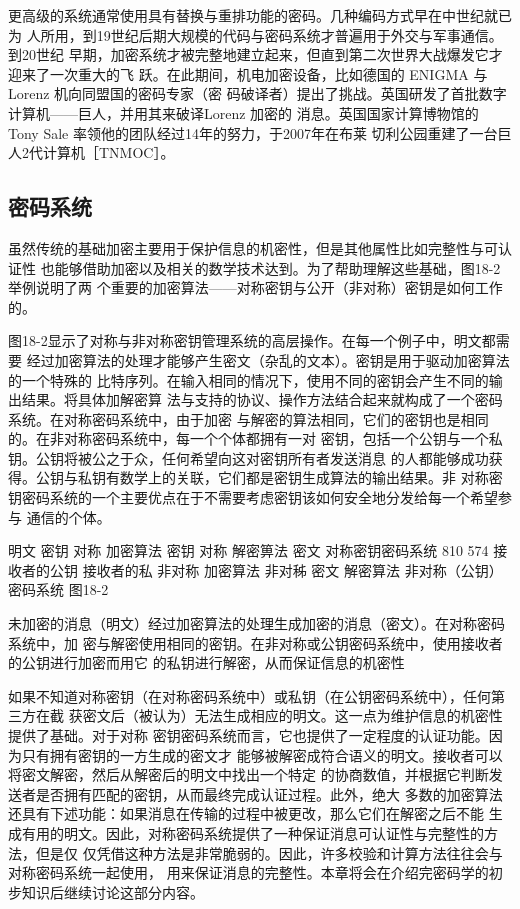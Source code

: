 更高级的系统通常使用具有替换与重排功能的密码。几种编码方式早在中世纪就已为
人所用，到19世纪后期大规模的代码与密码系统才普遍用于外交与军事通信。到20世纪
早期，加密系统才被完整地建立起来，但直到第二次世界大战爆发它才迎来了一次重大的飞
跃。在此期间，机电加密设备，比如德国的 ENIGMA 与Lorenz 机向同盟国的密码专家（密
码破译者）提出了挑战。英国研发了首批数字计算机——巨人，并用其来破译Lorenz 加密的
消息。英国国家计算博物馆的 Tony Sale 率领他的团队经过14年的努力，于2007年在布莱
切利公园重建了一台巨人2代计算机［TNMOC］。

\subsection{密码系统}
虽然传统的基础加密主要用于保护信息的机密性，但是其他属性比如完整性与可认证性
也能够借助加密以及相关的数学技术达到。为了帮助理解这些基础，图18-2举例说明了两
个重要的加密算法——对称密钥与公开（非对称）密钥是如何工作的。

图18-2显示了对称与非对称密钥管理系统的高层操作。在每一个例子中，明文都需要
经过加密算法的处理才能够产生密文（杂乱的文本）。密钥是用于驱动加密算法的一个特殊的
比特序列。在输入相同的情况下，使用不同的密钥会产生不同的输出结果。将具体加解密算
法与支持的协议、操作方法结合起来就构成了一个密码系统。在对称密码系统中，由于加密
与解密的算法相同，它们的密钥也是相同的。在非对称密码系统中，每一个个体都拥有一对
密钥，包括一个公钥与一个私钥。公钥将被公之于众，任何希望向这对密钥所有者发送消息
的人都能够成功获得。公钥与私钥有数学上的关联，它们都是密钥生成算法的输出结果。非
对称密钥密码系统的一个主要优点在于不需要考虑密钥该如何安全地分发给每一个希望参与
通信的个体。

明文
密钥
对称
加密算法
密钥
对称
解密箅法
密文
对称密钥密码系统
810
574
接收者的公钥
接收者的私
非对称
加密算法
非对秭
密文
解密算法
非对称（公钥）密码系统
图18-2

未加密的消息（明文）经过加密算法的处理生成加密的消息（密文）。在对称密码系统中，加
密与解密使用相同的密钥。在非对称或公钥密码系统中，使用接收者的公钥进行加密而用它
的私钥进行解密，从而保证信息的机密性

如果不知道对称密钥（在对称密码系统中）或私钥（在公钥密码系统中），任何第三方在截
获密文后（被认为）无法生成相应的明文。这一点为维护信息的机密性提供了基础。对于对称
密钥密码系统而言，它也提供了一定程度的认证功能。因为只有拥有密钥的一方生成的密文才
能够被解密成符合语义的明文。接收者可以将密文解密，然后从解密后的明文中找出一个特定
的协商数值，并根据它判断发送者是否拥有匹配的密钥，从而最终完成认证过程。此外，绝大
多数的加密算法还具有下述功能：如果消息在传输的过程中被更改，那么它们在解密之后不能
生成有用的明文。因此，对称密码系统提供了一种保证消息可认证性与完整性的方法，但是仅
仅凭借这种方法是非常脆弱的。因此，许多校验和计算方法往往会与对称密码系统一起使用，
用来保证消息的完整性。本章将会在介绍完密码学的初步知识后继续讨论这部分内容。

